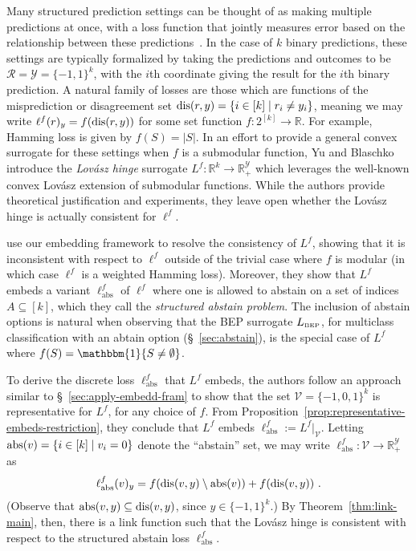 \documentclass[11pt]{article}
\newcommand{\reals}{\mathbb{R}}
\newcommand{\BEP}{L_{\text{\tiny BEP}}}
\newcommand{\R}{\mathcal{R}}
\newcommand{\V}{\mathcal{V}}
\newcommand{\Y}{\mathcal{Y}}
\newcommand{\ones}{\mathbbm{1}}
\newcommand{\ellabs}{\ell_{\text{abs}}^f}
\begin{document}
Many structured prediction settings can be thought of as making multiple predictions at once, with a loss function that jointly measures error based on the relationship between these predictions~\cite{hazan2010direct, gao2011consistency, osokin2017structured}.
In the case of $k$ binary predictions, these settings are typically formalized by taking the predictions and outcomes to be $\R=\Y=\{-1,1\}^k$, with the $i$th coordinate giving the result for the $i$th binary prediction.
A natural family of losses are those which are functions of the misprediction or disagreement set $\mathrm{dis}(r,y) = \{i \in [k] \mid r_i \neq y_i\}$, meaning we may write $\ell^f(r)_y = f(\mathrm{dis}(r,y))$ for some set function $f:2^{[k]}\to\reals$.
For example, Hamming loss is given by $f(S) = |S|$.
In an effort to provide a general convex surrogate for these settings when $f$ is a submodular function, Yu and Blaschko~\cite{yu2018lovasz} introduce the \emph{Lov\'asz hinge} surrogate $L^f:\reals^k\to\reals^\Y_+$ which leverages the well-known convex Lov\'asz extension of submodular functions.
While the authors provide theoretical justification and experiments, they leave open whether the Lov\'asz hinge is actually consistent for $\ell^f$.

\citet{ourlovaszpaper} use our embedding framework to resolve the consistency of $L^f$, showing that it is inconsistent with respect to $\ell^f$ outside of the trivial case where $f$ is modular (in which case $\ell^f$ is a weighted Hamming loss).
Moreover, they show that $L^f$ embeds a variant $\ellabs$ of $\ell^f$ where one is allowed to abstain on a set of indices $A \subseteq [k]$, which they call the \emph{structured abstain problem}.
The inclusion of abstain options is natural when observing that the BEP surrogate $\BEP$, for multiclass classification with an abtain option (\S~\ref{sec:abstain}), is the special case of $L^f$ where $f(S) = \ones\{S \neq \emptyset\}$.

To derive the discrete loss $\ellabs$ that $L^f$ embeds, the authors follow an approach similar to \S~\ref{sec:apply-embedd-fram} to show that the set $\V = \{-1,0,1\}^k$ is representative for $L^f$, for any choice of $f$.
From Proposition~\ref{prop:representative-embeds-restriction}, they conclude that $L^f$ embeds $\ellabs := L^f|_{\V}$.
Letting $\mathrm{abs}(v) = \{i\in[k] \mid v_i = 0\}$ denote the ``abstain'' set, we may write $\ellabs : \V \to \reals^\Y_+$ as
\begin{equation}
	\ellabs(v)_y = f(\dis(v,y) \setminus \abs(v)) + f(\dis(v,y))~.
\end{equation}
(Observe that $\mathrm{abs}(v,y) \subseteq \mathrm{dis}(v,y)$, since $y\in\{-1,1\}^k$.)
By Theorem~\ref{thm:link-main}, then, there is a link function such that the Lov\'asz hinge is consistent with respect to the structured abstain loss $\ellabs$.
\end{document}
